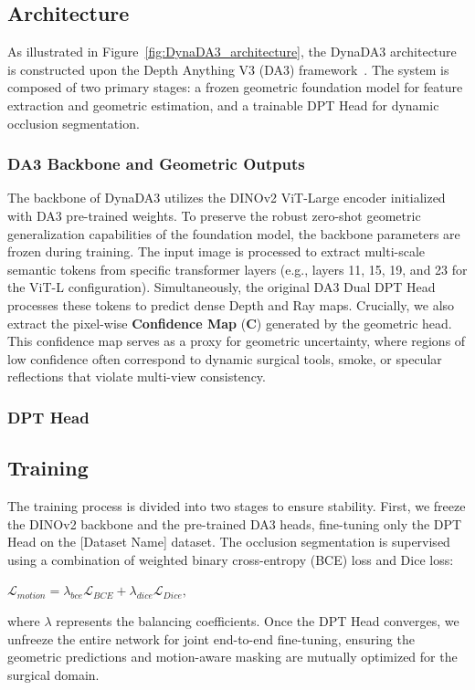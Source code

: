 \subsection{Architecture}
\label{subsec:architecture}

As illustrated in Figure~\ref{fig:DynaDA3_architecture}, the DynaDA3 architecture is constructed upon the Depth Anything V3 (DA3) framework~\cite{lin2025da3}. The system is composed of two primary stages: a frozen geometric foundation model for feature extraction and geometric estimation, and a trainable DPT Head for dynamic occlusion segmentation.

\subsubsection*{DA3 Backbone and Geometric Outputs}
The backbone of DynaDA3 utilizes the DINOv2 ViT-Large encoder initialized with DA3 pre-trained weights. To preserve the robust zero-shot geometric generalization capabilities of the foundation model, the backbone parameters are frozen during training. 
The input image is processed to extract multi-scale semantic tokens from specific transformer layers (e.g., layers 11, 15, 19, and 23 for the ViT-L configuration). Simultaneously, the original DA3 Dual DPT Head processes these tokens to predict dense Depth and Ray maps. Crucially, we also extract the pixel-wise \textbf{Confidence Map} ($\mathbf{C}$) generated by the geometric head. This confidence map serves as a proxy for geometric uncertainty, where regions of low confidence often correspond to dynamic surgical tools, smoke, or specular reflections that violate multi-view consistency.

\subsubsection*{DPT Head}

\subsection{Training}
The training process is divided into two stages to ensure stability. First, we freeze the DINOv2 backbone and the pre-trained DA3 heads, fine-tuning only the DPT Head on the [Dataset Name] dataset. The occlusion segmentation is supervised using a combination of weighted binary cross-entropy (BCE) loss and Dice loss:
\begin{center}
    $ \mathcal{L}_{motion} = \lambda_{bce}\mathcal{L}_{BCE} + \lambda_{dice}\mathcal{L}_{Dice}, $
\end{center}
where $\lambda$ represents the balancing coefficients. Once the DPT Head converges, we unfreeze the entire network for joint end-to-end fine-tuning, ensuring the geometric predictions and motion-aware masking are mutually optimized for the surgical domain.
